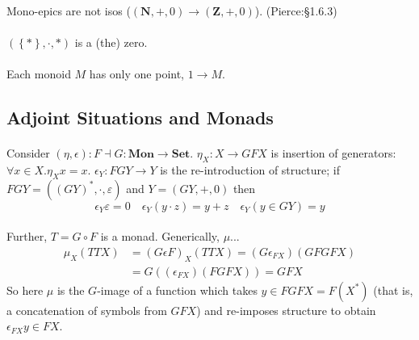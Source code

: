 \documentclass[10pt,twocolumn,letterpaper]{article}
\newcommand{\set}[1]{\left\{{#1}\right\}}
\begin{document}
  \paragraph{}
  Mono-epics are not isos ($(\mathbf{N},+,0) \to (\mathbf{Z},+,0)$).
  (Pierce:\S1.6.3)

  \paragraph{}
  $(\set{*},\cdot,*)$ is a (the) zero.

  \paragraph{}
  Each monoid $M$ has only one point, $1 \to M$.

\subsection{Adjoint Situations and Monads}

  \paragraph{}
  Consider $(\eta, \epsilon) : F \dashv G : \mathbf{Mon} \to \mathbf{Set}$.
  $\eta_X : X \to GFX$ is insertion of generators: $\forall x \in X . \eta_X x = x$.
  $\epsilon_Y : FGY \to Y$ is the re-introduction of structure;
  if $FGY = ((GY)^*, \cdot, \varepsilon)$ and $Y = (GY, +, 0)$ then
    \[ \epsilon_Y \varepsilon = 0
      \quad \epsilon_Y (y \cdot z) =  y + z
      \quad \epsilon_Y (y \in GY)  =  y
    \]

  \paragraph{}
  Further, $T = G \circ F$ is a monad.  Generically, $\mu$...
  \begin{align*}
    \mu_X (TTX) &= (G \epsilon F)_X (TTX) = (G \epsilon_{FX}) (GFGFX) \\
       &= G ((\epsilon_{FX})(FGFX)) = GFX
  \end{align*}
  So here $\mu$ is the $G$-image of a function which takes $y \in FGFX =
  F(X^*)$ (that is, a concatenation of symbols from $GFX$) and re-imposes
  structure to obtain $\epsilon_{FX} y \in FX$.
\end{document}
